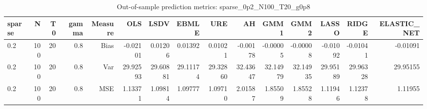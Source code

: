 \begin{table}[!htbp]\centering
\caption{Out-of-sample prediction metrics: sparse_0p2_N100_T20_g0p8}
\label{tab:table3_sparse_0p2_N100_T20_g0p8}
\begin{tabular}{lrrrrrrrrrrrrrr}
\hline
sparse & N & T0 & gamma & Measure & OLS & LSDV & EBMLE & URE & AH & GMM1 & GMM2 & LASSO & RIDGE & ELASTIC_NET \\
\hline
0.2 & 100 & 20 & 0.8 & Bias & -0.02101 & 0.01206 & 0.01392 & 0.01021 & -0.00178 & -0.00005 & -0.00008 & -0.01092 & -0.01041 & -0.01091 \\
0.2 & 100 & 20 & 0.8 & Var & 29.92593 & 29.60881 & 29.11174 & 29.32860 & 32.43647 & 32.14979 & 32.14935 & 29.95189 & 29.96328 & 29.95155 \\
0.2 & 100 & 20 & 0.8 & MSE & 1.13371 & 1.09814 & 1.09777 & 1.09710 & 2.01587 & 1.85509 & 1.85528 & 1.11946 & 1.12378 & 1.11955 \\
\hline
\end{tabular}
\end{table}


